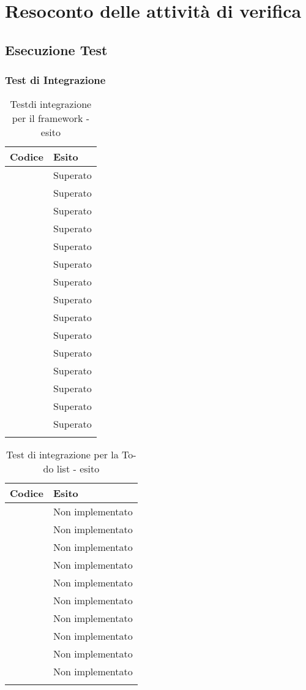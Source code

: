 \section{Resoconto delle attività di verifica}\label{app:resoconto_verifica}

\subsection{Esecuzione Test}
\subsubsection{Test di Integrazione}
\begin{longtable}{|c|c|}
	\hline \multicolumn{1}{|l|}{\textbf{Codice}} & \multicolumn{1}{l|}{\textbf{Esito}}
	\\
	\hline \testt{} & Superato\\
	\hline \testt{} & Superato\\
	\hline \testt{} & Superato\\
	\hline \testt{} & Superato\\
	\hline \testt{} & Superato\\
	\hline \testt{} & Superato\\
	\hline \testt{} & Superato\\
	\hline \testt{} & Superato\\
	\hline \testt{} & Superato\\
	\hline \testt{} & Superato\\
	\hline \testt{} & Superato\\
	\hline \testt{} & Superato\\
	\hline \testt{} & Superato\\
	\hline \testt{} & Superato\\
	\hline \testt{} & Superato\\
	\hline
	\caption{Testdi integrazione per il framework - esito}
\end{longtable}
\begin{longtable}{|c|c|}
	\hline \multicolumn{1}{|l|}{\textbf{Codice}} & \multicolumn{1}{l|}{\textbf{Esito}}
	\\
	\hline \testt{} & Non implementato\\
	\hline \testt{} & Non implementato\\
	\hline \testt{} & Non implementato\\
	\hline \testt{} & Non implementato\\
	\hline \testt{} & Non implementato\\
	\hline \testt{} & Non implementato\\
	\hline \testt{} & Non implementato\\
	\hline \testt{} & Non implementato\\
	\hline \testt{} & Non implementato\\
	\hline \testt{} & Non implementato\\
	\hline
	\caption{Test di integrazione per la To-do list - esito}
\end{longtable}
